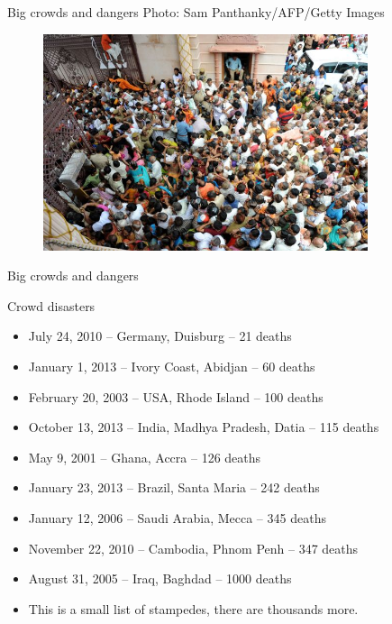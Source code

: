 \documentclass[presentation]{beamer}\mode<presentation>{\usetheme{sapere}}
\begin{document}
\begin{frame}{Big crowds and dangers}
  \centering
  \scriptsize
  Photo: Sam Panthanky/AFP/Getty Images
  \begin{figure}
    \includegraphics[width=0.85\textwidth]{imgs/india_stampede} 
  \end{figure}
\end{frame}

\begin{frame}{Big crowds and dangers}
  \begin{block}{Crowd disasters}
    \begin{itemize}
     \item July 24, 2010 -- Germany, Duisburg -- 21 deaths
     \item January 1, 2013 -- Ivory Coast, Abidjan -- 60 deaths
     \item February 20, 2003 -- USA, Rhode Island -- 100 deaths
     \item October 13, 2013 -- India, Madhya Pradesh, Datia -- 115 deaths
     \item May 9, 2001 -- Ghana, Accra -- 126 deaths
     \item January 23, 2013 -- Brazil, Santa Maria -- 242 deaths
     \item January 12, 2006 -- Saudi Arabia, Mecca -- 345 deaths
     \item November 22, 2010 -- Cambodia, Phnom Penh -- 347 deaths
     \item August 31, 2005 -- Iraq, Baghdad -- 1000 deaths
     \item This is a small list of stampedes, there are thousands more.
    \end{itemize}
  \end{block}
\end{frame}
\end{document}
